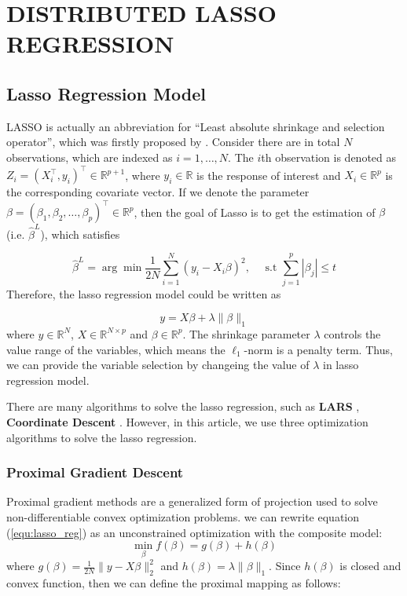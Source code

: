 \documentclass[11pt,en,authoryear]{elegantpaper}
\numberwithin{equation}{section}
\newcommand{\mbR}{\mathbb{R}}
\begin{document}
\section{DISTRIBUTED LASSO REGRESSION}\label{sec:2}

\subsection{Lasso Regression Model}\label{section:lasso_reg_model}

LASSO is actually an abbreviation for “Least absolute shrinkage and selection operator”, which was firstly proposed by \cite{tibshirani1996regression}. Consider there are in total $N$ observations, which are indexed as $i = 1,\ldots,N$. The $i$th observation is denoted as $Z_i = (X_i^{\top},y_i)^{\top} \in \mathbb{R}^{p+1}$, where $y_i \in \mathbb{R}$ is the response of interest and $X_i \in \mathbb{R}^p$ is the corresponding covariate vector. If we denote the parameter $\beta = (\beta_1, \beta_2, \ldots, \beta_p)^{\top} \in \mathbb{R}^{p}$, then the goal of Lasso is to get the estimation of $\beta$ (i.e. $\hat{\beta}^{L}$), which satisfies

\begin{equation}\label{equ:lasso}
    \hat{\beta}^{L}=\arg \min \frac{1}{2 N} \sum_{i=1}^{N}\left(y_{i}-X_i \beta\right)^{2}, \quad \text { s.t } \sum_{j=1}^{p}\left|\beta_{j}\right| \leq t
\end{equation}
Therefore, the lasso regression model could be written as 

\begin{equation}\label{equ:lasso_reg}
    y = X \beta + \lambda \|\beta \|_1
\end{equation}
where $y \in \mbR^{N}$, $X \in \mbR^{N \times p}$ and $\beta \in \mbR^{p}$. The shrinkage parameter $\lambda$ controls the value range of the variables, which means the $\ell_1$-norm is a penalty term. Thus, we can provide the variable selection by changeing the value of $\lambda$ in lasso regression model.

There are many algorithms to solve the lasso regression, such as \textbf{LARS} \citep{efron2004least}, \textbf{Coordinate Descent} \citep{wu2008coordinate}. However, in this article, we use three optimization algorithms to solve the lasso regression.

\subsubsection{Proximal Gradient Descent}
Proximal gradient methods are a generalized form of projection used to solve non-differentiable convex optimization problems. we can rewrite  equation (\ref{equ:lasso_reg}) as an unconstrained optimization with the composite model:
\begin{equation}
    \min_{\beta} f(\beta)=g(\beta)+h(\beta)
\end{equation}
where $g(\beta) = \frac{1}{2N}\|y - X \beta\|_{2}^{2}$ and $h(\beta) = \lambda\| \beta\|_1$. Since $h(\beta)$ is closed and convex function, then we can define the proximal mapping as follows:
\end{document}
